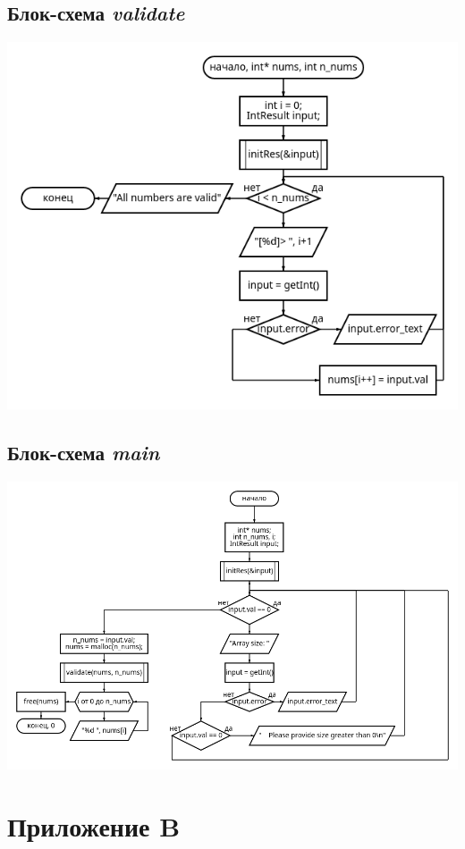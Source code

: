 \documentclass[a4paper, 12pt]{article}
\begin{document}
\subsection{Блок-схема \textit{validate}}
\includegraphics[width=\columnwidth]{validate.png}

\subsection{Блок-схема \textit{main}}
\includegraphics[width=\columnwidth]{main.png}


\cleardoublepage


\section*{Приложение B}
\end{document}
